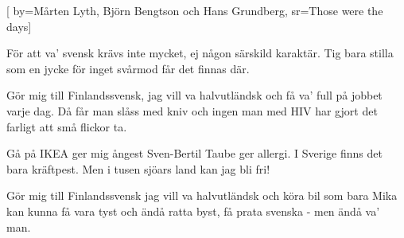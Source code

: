 


[ 	%
	by={Mårten Lyth, Björn Bengtson och Hans Grundberg},	%
	sr={Those were the days}]		%
	
\beginverse*		%
För att va' svensk krävs inte mycket,
ej någon särskild karaktär.
Tig bara stilla som en jycke
för inget svårmod får det finnas där.
\endverse			%

\beginchorus
Gör mig till Finlandssvensk,
jag vill va halvutländsk 
och få va' full på jobbet varje dag.
Då får man slåss med kniv
och ingen man med HIV 
har gjort det farligt att små flickor ta.
\endchorus

\beginverse*		%
Gå på IKEA ger mig ångest 
Sven-Bertil Taube ger allergi.
I Sverige finns det bara kräftpest.
Men i tusen sjöars land kan jag bli fri!
\endverse			%

\beginchorus
Gör mig till Finlandssvensk 
jag vill va halvutländsk
och köra bil som bara Mika kan
kunna få vara tyst
och ändå ratta byst,
få prata svenska - men ändå va' man.
\endchorus
\endsong			%
